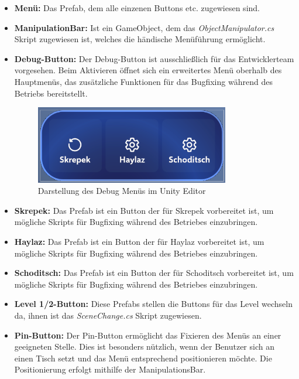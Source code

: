 \begin{itemize}
    \item \textbf{Menü:} Das Prefab, dem alle einzenen Buttons etc. zugewiesen sind.
    \item \textbf{ManipulationBar:} Ist ein GameObject, dem das \textit{ObjectManipulator.cs} Skript zugewiesen ist, welches
    die händische Menüführung ermöglicht.
    \item \textbf{Debug-Button:} Der Debug-Button ist ausschließlich für das Entwicklerteam vorgesehen. Beim Aktivieren öffnet
    sich ein erweitertes Menü oberhalb des Hauptmenüs, das zusätzliche Funktionen für das Bugfixing während des Betriebs
    bereitstellt.
    \begin{figure}[h]
        \centering
        \includegraphics[width=0.8\textwidth]{images/debugmenubar.png}
        \caption{Darstellung des Debug Menüs im Unity Editor}
        \label{fig:debugmenübar}
    \end{figure}
    \item \textbf{Skrepek:} Das Prefab ist ein Button der für Skrepek vorbereitet ist, um mögliche Skripts für Bugfixing
    während des Betriebes einzubringen.
    \item \textbf{Haylaz:} Das Prefab ist ein Button der für Haylaz vorbereitet ist, um mögliche Skripts für Bugfixing
    während des Betriebes einzubringen.
    \item \textbf{Schoditsch:} Das Prefab ist ein Button der für Schoditsch vorbereitet ist, um mögliche Skripts für Bugfixing
    während des Betriebes einzubringen.
    \item \textbf{Level 1/2-Button:} Diese Prefabs stellen die Buttons für das Level wechseln da, ihnen ist das
    \textit{SceneChange.cs} Skript zugewiesen.
    \item \textbf{Pin-Button:} Der Pin-Button ermöglicht das Fixieren des Menüs an einer geeigneten Stelle. Dies ist besonders nützlich,
    wenn der Benutzer sich an einen Tisch setzt und das Menü entsprechend positionieren möchte. Die
    Positionierung erfolgt mithilfe der ManipulationsBar.
\end{itemize}

